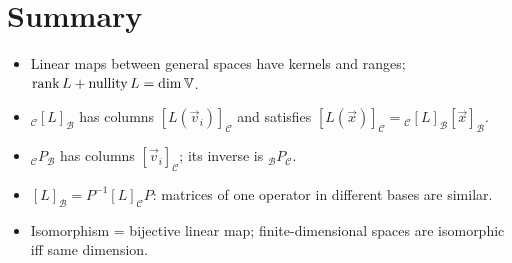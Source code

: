 \section*{Summary}
\begin{itemize}
  \item Linear maps between general spaces have kernels and ranges; $\operatorname{rank} L+\operatorname{nullity} L=\dim\mathbb V$.
  \item ${}_{\mathcal C}[L]_{\mathcal B}$ has columns $[L(\vec v_i)]_{\mathcal C}$ and satisfies
        $[L(\vec x)]_{\mathcal C}={}_{\mathcal C}[L]_{\mathcal B}[\vec x]_{\mathcal B}$.
  \item ${}_{\mathcal C}P_{\mathcal B}$ has columns $[\vec v_i]_{\mathcal C}$; its inverse is ${}_{\mathcal B}P_{\mathcal C}$.
  \item $[L]_{\mathcal B}=P^{-1}[L]_{\mathcal C}P$: matrices of one operator in different bases are similar.
  \item Isomorphism = bijective linear map; finite-dimensional spaces are isomorphic iff same dimension.
\end{itemize}
